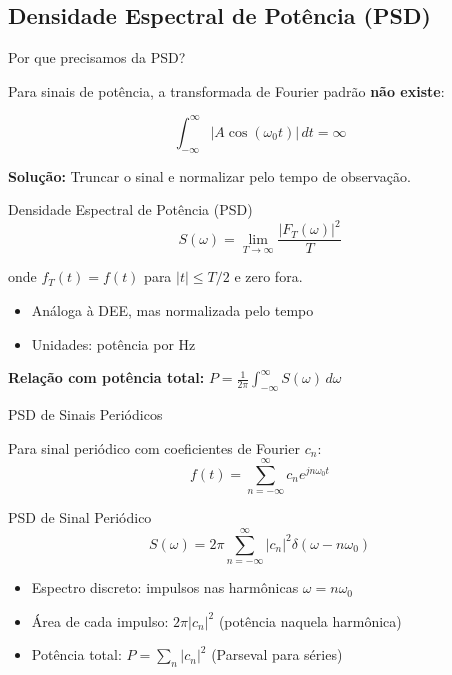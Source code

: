 \subsection{Densidade Espectral de Potência (PSD)}

\begin{frame}{Por que precisamos da PSD?}

Para sinais de potência, a transformada de Fourier padrão \textbf{não existe}:

\[
\int_{-\infty}^{\infty} |A\cos(\omega_0 t)|\, dt = \infty
\]

\textbf{Solução:} Truncar o sinal e normalizar pelo tempo de observação.

\begin{block}{Densidade Espectral de Potência (PSD)}
\[
S(\omega) = \lim_{T \to \infty} \frac{|F_T(\omega)|^2}{T}
\]
\end{block}

onde $f_T(t) = f(t)$ para $|t| \leq T/2$ e zero fora.

\begin{itemize}
\item Análoga à DEE, mas normalizada pelo tempo
\item Unidades: potência por Hz
\end{itemize}

\textbf{Relação com potência total:} $P = \frac{1}{2\pi} \int_{-\infty}^{\infty} S(\omega)\, d\omega$

\end{frame}


\begin{frame}{PSD de Sinais Periódicos}

Para sinal periódico com coeficientes de Fourier $c_n$:
\[
f(t) = \sum_{n=-\infty}^{\infty} c_n e^{jn\omega_0 t}
\]

\begin{block}{PSD de Sinal Periódico}
\[
S(\omega) = 2\pi \sum_{n=-\infty}^{\infty} |c_n|^2 \delta(\omega - n\omega_0)
\]
\end{block}

\begin{itemize}
\item Espectro discreto: impulsos nas harmônicas $\omega = n\omega_0$
\item Área de cada impulso: $2\pi|c_n|^2$ (potência naquela harmônica)
\item Potência total: $P = \sum_{n} |c_n|^2$ (Parseval para séries)
\end{itemize}

\end{frame}

